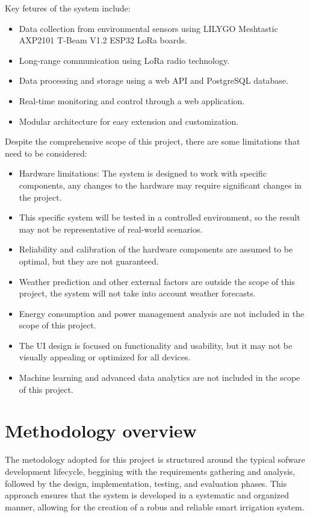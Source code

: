Key fetures of the system include:
\begin{itemize}
    \item Data collection from environmental sensors using LILYGO Meshtastic AXP2101 T-Beam V1.2 ESP32 LoRa boards.
    \item Long-range communication using LoRa radio technology.
    \item Data processing and storage using a web API and PostgreSQL database.
    \item Real-time monitoring and control through a web application.
    \item Modular architecture for easy extension and customization.
\end{itemize}
Despite the comprehensive scope of this project, there are some limitations that need to be considered:
\begin{itemize}
    \item Hardware limitations: The system is designed to work with specific components, any changes to
     the hardware may require significant changes in the project.
    \item This specific system will be tested in a controlled environment, so the result may not be representative of 
    real-world scenarios. 
    \item Reliability and calibration of the hardware components are assumed to be optimal, but they are not guaranteed.
    \item Weather prediction and other external factors are outside the scope of this project,
    the system will not take into account weather forecasts.
    \item Energy consumption and power management analysis are not included in the scope of this project.
    \item The UI design is focused on functionality and usability, but it may not be visually appealing or optimized for all devices.
    \item Machine learning and advanced data analytics are not included in the scope of this project.
\end{itemize}

\section{Methodology overview}

The metodology adopted for this project is structured around the typical sofware development lifecycle,
beggining with the requirements gathering and analysis, followed by the design, implementation, testing, and evaluation phases.
This approach ensures that the system is developed in a systematic and organized manner, allowing for the creation 
of a robus and reliable smart irrigation system.

